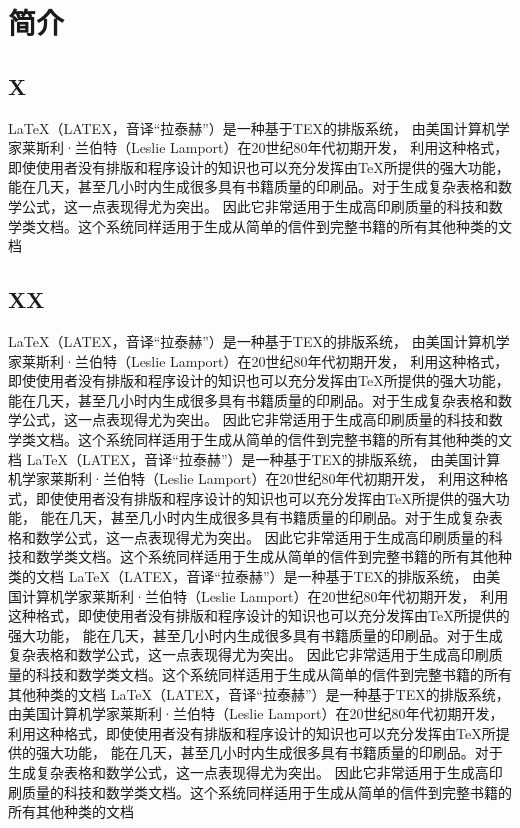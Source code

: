 
\chapter{简\quad 介}
\section{X}
LaTeX（LATEX，音译“拉泰赫”）是一种基于ΤΕΧ的排版系统，
由美国计算机学家莱斯利·兰伯特（Leslie Lamport）在20世纪80年代初期开发，
利用这种格式，即使使用者没有排版和程序设计的知识也可以充分发挥由TeX所提供的强大功能，
能在几天，甚至几小时内生成很多具有书籍质量的印刷品。对于生成复杂表格和数学公式，这一点表现得尤为突出。
因此它非常适用于生成高印刷质量的科技和数学类文档。这个系统同样适用于生成从简单的信件到完整书籍的所有其他种类的文档

\section{XX}
LaTeX（LATEX，音译“拉泰赫”）是一种基于ΤΕΧ的排版系统，
由美国计算机学家莱斯利·兰伯特（Leslie Lamport）在20世纪80年代初期开发，
利用这种格式，即使使用者没有排版和程序设计的知识也可以充分发挥由TeX所提供的强大功能，
能在几天，甚至几小时内生成很多具有书籍质量的印刷品。对于生成复杂表格和数学公式，这一点表现得尤为突出。
因此它非常适用于生成高印刷质量的科技和数学类文档。这个系统同样适用于生成从简单的信件到完整书籍的所有其他种类的文档
LaTeX（LATEX，音译“拉泰赫”）是一种基于ΤΕΧ的排版系统，
由美国计算机学家莱斯利·兰伯特（Leslie Lamport）在20世纪80年代初期开发，
利用这种格式，即使使用者没有排版和程序设计的知识也可以充分发挥由TeX所提供的强大功能，
能在几天，甚至几小时内生成很多具有书籍质量的印刷品。对于生成复杂表格和数学公式，这一点表现得尤为突出。
因此它非常适用于生成高印刷质量的科技和数学类文档。这个系统同样适用于生成从简单的信件到完整书籍的所有其他种类的文档
LaTeX（LATEX，音译“拉泰赫”）是一种基于ΤΕΧ的排版系统，
由美国计算机学家莱斯利·兰伯特（Leslie Lamport）在20世纪80年代初期开发，
利用这种格式，即使使用者没有排版和程序设计的知识也可以充分发挥由TeX所提供的强大功能，
能在几天，甚至几小时内生成很多具有书籍质量的印刷品。对于生成复杂表格和数学公式，这一点表现得尤为突出。
因此它非常适用于生成高印刷质量的科技和数学类文档。这个系统同样适用于生成从简单的信件到完整书籍的所有其他种类的文档
LaTeX（LATEX，音译“拉泰赫”）是一种基于ΤΕΧ的排版系统，
由美国计算机学家莱斯利·兰伯特（Leslie Lamport）在20世纪80年代初期开发，
利用这种格式，即使使用者没有排版和程序设计的知识也可以充分发挥由TeX所提供的强大功能，
能在几天，甚至几小时内生成很多具有书籍质量的印刷品。对于生成复杂表格和数学公式，这一点表现得尤为突出。
因此它非常适用于生成高印刷质量的科技和数学类文档。这个系统同样适用于生成从简单的信件到完整书籍的所有其他种类的文档
